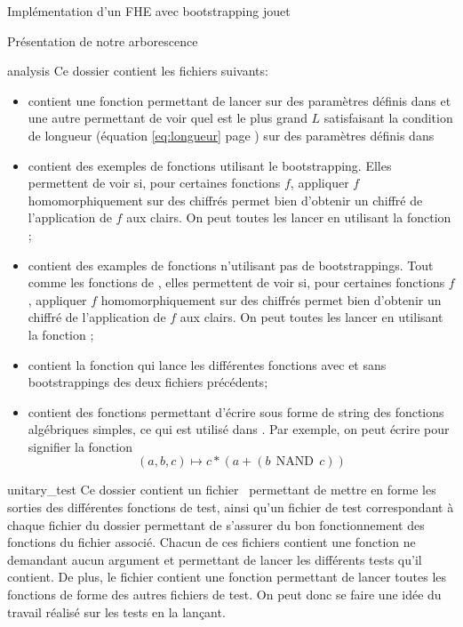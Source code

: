 \begin{section}{Implémentation d'un FHE avec bootstrapping \og{}jouet\fg~{}}
\begin{subsection}{Présentation de notre arborescence}
\begin{subsubsection}{analysis}
Ce dossier contient les fichiers suivants:
\begin{itemize}
\item {} contient une fonction permettant de lancer  sur des paramètres définis dans  et une autre permettant de voir quel est le plus grand $L$ satisfaisant la condition de longueur (équation \eqref{eq:longueur} page \pageref{eq:longueur}) sur des paramètres définis dans 
\item {} contient des exemples de fonctions utilisant le bootstrapping. Elles
permettent de voir si, pour certaines fonctions $f$, appliquer $f$ homomorphiquement sur des chiffrés permet bien d'obtenir un chiffré de l'application de $f$ aux clairs.  On peut toutes les lancer en  utilisant  la fonction
;
\item {} contient des examples de fonctions n'utilisant pas de bootstrappings.
Tout comme les fonctions de , elles permettent de voir si, pour certaines fonctions $f$, appliquer $f$
homomorphiquement sur des chiffrés permet bien d'obtenir un chiffré de l'application de $f$ aux clairs.  On peut toutes les lancer en  utilisant  la fonction ;
\item {} contient la fonction  qui lance les différentes fonctions avec
et sans bootstrappings des deux fichiers précédents;
\item {} contient des fonctions permettant d'écrire sous forme de string des fonctions algébriques
simples, ce qui est utilisé dans  . Par exemple, on peut écrire
 pour signifier la fonction \[(a,b,c) \mapsto c * (a + (b\:\: \text{NAND}\:\: c)) \]
\end{itemize}
\end{subsubsection} %

\begin{subsubsection}{unitary\_test}
Ce dossier contient un fichier  permettant de mettre en forme les sorties des différentes
fonctions de test, ainsi qu'un fichier de test correspondant à chaque fichier du dossier  permettant de s'assurer du bon fonctionnement des fonctions du fichier associé.  Chacun de ces
fichiers contient une fonction  ne demandant aucun argument et permettant de lancer les différents
tests qu'il contient. De plus, le fichier  contient une fonction  permettant de
lancer toutes les fonctions de forme  des autres fichiers de test.  On peut donc se faire une idée
du travail réalisé sur les tests en la lançant.
\end{subsubsection} %
\end{subsection}
\end{section}
